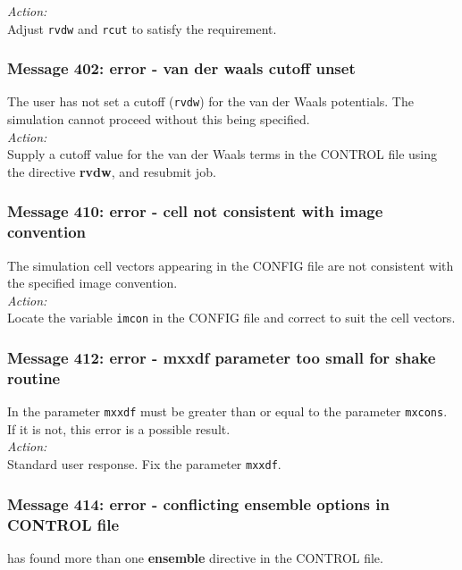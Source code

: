 \noindent
{\em Action:} \\ 
Adjust {\tt rvdw} and {\tt rcut} to satisfy the \D{} requirement.

\subsubsection*{Message 402: error - van der waals cutoff unset}

The user has not set a cutoff ({\tt rvdw}) for the van der
Waals 
potentials. The simulation cannot proceed without this being
specified. \\

\noindent
{\em Action:} \\
Supply a cutoff value for the van der Waals terms in the CONTROL file
using the directive {\bf rvdw}, and resubmit job.

\subsubsection*{Message 410: error - cell not consistent with image convention}

The simulation cell vectors appearing in the CONFIG file are not
consistent with the specified image convention. \\

\noindent
{\em Action:} \\ Locate the variable {\tt imcon} in the CONFIG file
and correct to suit the cell vectors.

\subsubsection*{Message 412: error - mxxdf parameter too small for
shake routine}

In \D{} the parameter {\tt mxxdf} must be greater than
or equal to the parameter {\tt mxcons}. If it is not, this error is a
possible result.\\

\noindent
{\em Action:} \\ Standard user response. Fix the parameter {\tt mxxdf}.

\subsubsection*{Message 414: error - conflicting ensemble  options in
CONTROL file}

\D{} has found more than one {\bf ensemble} directive in the
CONTROL file.\\

